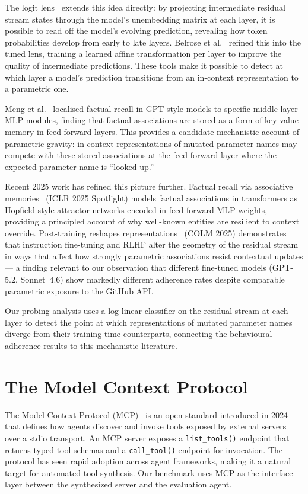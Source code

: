 \documentclass[12pt]{report}
\begin{document}
The logit lens~\cite{nostalgebraist2020logitlens} extends this idea directly: by
projecting intermediate residual stream states through the model's unembedding
matrix at each layer, it is possible to read off the model's evolving
prediction, revealing how token probabilities develop from early to late
layers. Belrose et al.~\cite{belrose2023tunedlens} refined this into the
tuned lens, training a learned affine transformation per layer to improve the
quality of intermediate predictions. These tools make it possible to detect
at which layer a model's prediction transitions from an in-context
representation to a parametric one.

Meng et al.~\cite{meng2022rome} localised factual recall in GPT-style models
to specific middle-layer MLP modules, finding that factual associations are
stored as a form of key-value memory in feed-forward layers. This provides a
candidate mechanistic account of parametric gravity: in-context
representations of mutated parameter names may compete with these stored
associations at the feed-forward layer where the expected parameter name
is ``looked up.''

Recent 2025 work has refined this picture further.
Factual recall via associative memories~\cite{factualrecall2025} (ICLR 2025
Spotlight) models factual associations in transformers as Hopfield-style
attractor networks encoded in feed-forward MLP weights, providing a
principled account of why well-known entities are resilient to context
override. Post-training reshapes representations~\cite{posttrainingreshapes2025}
(COLM 2025) demonstrates that instruction fine-tuning and RLHF alter the
geometry of the residual stream in ways that affect how strongly parametric
associations resist contextual updates --- a finding relevant to our
observation that different fine-tuned models (GPT-5.2, Sonnet~4.6)
show markedly different adherence rates despite comparable parametric
exposure to the GitHub API.

Our probing analysis uses a log-linear classifier on the
residual stream at each layer to detect the point at which representations
of mutated parameter names diverge from their training-time counterparts,
connecting the behavioural adherence results to this mechanistic literature.

\section{The Model Context Protocol}

The Model Context Protocol (MCP)~\cite{anthropic2024mcp} is an open standard
introduced in 2024 that defines how agents discover and invoke tools exposed
by external servers over a stdio transport. An MCP server exposes a
\texttt{list\_tools()} endpoint that returns typed tool schemas and a
\texttt{call\_tool()} endpoint for invocation. The protocol has seen rapid
adoption across agent frameworks, making it a natural target for automated
tool synthesis. Our benchmark uses MCP as the interface layer between the
synthesized server and the evaluation agent.
\end{document}
